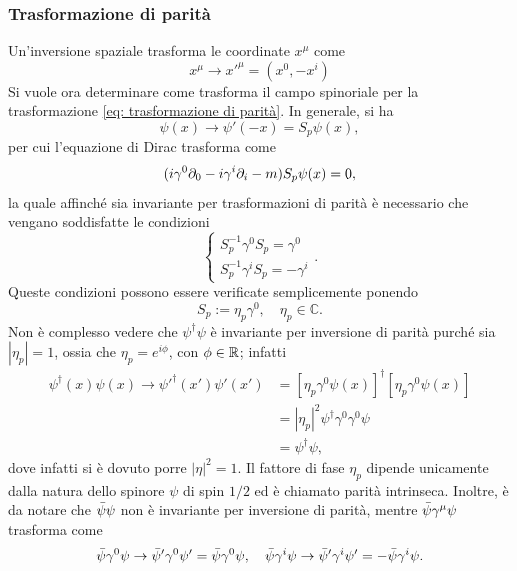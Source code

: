 \subsubsection{Trasformazione di parità}
Un'inversione spaziale trasforma le coordinate $x^\mu$ come
\begin{equation}
\label{eq: trasformazione di parità}
    x^\mu\to x'^\mu = (x^0,-x^i)
\end{equation}
Si vuole ora determinare come trasforma il campo spinoriale per la trasformazione \eqref{eq: trasformazione di parità}. In generale, si ha
\begin{equation}
    \psi(x)\to\psi'(-x) = S_p\psi(x),
\end{equation}
per cui l'equazione di Dirac trasforma come
\begin{equation}
    (i\gamma^0\partial_0 -i\gamma^i\partial_i -m)S_p\psi(x) = 0,
\end{equation}
la quale affinché sia invariante per trasformazioni di parità è necessario che vengano soddisfatte le condizioni
\begin{equation}
    \begin{cases}
        S_p^{-1}\gamma^0S_p = \gamma^0 \\
        S_p^{-1}\gamma^iS_p = -\gamma^i
    \end{cases}.
\end{equation}
Queste condizioni possono essere verificate semplicemente ponendo
\begin{equation}
    S_p:=\eta_p\gamma^0,\quad\eta_p\in\mathbb{C}.
\end{equation}
Non è complesso vedere che $\psi^\dagger\psi$ è invariante per inversione di parità purché sia $|\eta_p| = 1$, ossia che $\eta_p = e^{i\phi}$, con $\phi\in\mathbb{R}$; infatti
\begin{equation}
    \begin{split}
        \psi^\dagger(x)\psi(x)\to\psi'^\dagger(x')\psi'(x') &=  [\eta_p\gamma^0\psi(x)]^\dagger[\eta_p\gamma^0\psi(x)] \\
        &=|\eta_p|^2\psi^\dagger\gamma^0\gamma^0\psi \\
        &= \psi^\dagger\psi,
    \end{split}
\end{equation}
dove infatti si è dovuto porre $|\eta|^2 = 1$. Il fattore di fase $\eta_p$ dipende unicamente dalla natura dello spinore $\psi$ di spin $1/2$ ed è chiamato parità intrinseca. Inoltre, è da notare che $\bar{\psi}\psi$ non è invariante per inversione di parità, mentre $\bar{\psi}\gamma^\mu\psi$ trasforma come
\begin{equation}
    \bar{\psi}\gamma^0\psi\to\bar{\psi}'\gamma^0\psi' = \bar{\psi}\gamma^0\psi,\quad \bar{\psi}\gamma^i\psi\to\bar{\psi}'\gamma^i\psi' = -\bar{\psi}\gamma^i\psi.
\end{equation}

